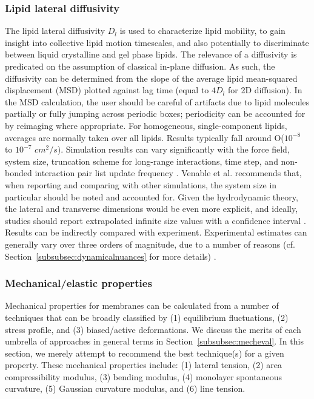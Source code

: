 \documentclass[9pt,bestpractices]{livecoms}
\begin{document}
\subsubsection{Lipid lateral diffusivity}
\label{subsubsec:latdiff}
The lipid lateral diffusivity $D_l$ is used to characterize lipid mobility, to gain insight into collective lipid motion timescales, and also potentially to discriminate between liquid crystalline and gel phase lipids.
The relevance of a diffusivity is predicated on the assumption of classical in-plane diffusion.
As such, the diffusivity can be determined from the slope of the average lipid mean-squared displacement (MSD) plotted against lag time (equal to $4D_l$ for 2D diffusion).
In the MSD calculation, the user should be careful of artifacts due to lipid molecules partially or fully jumping across periodic boxes; periodicity can be accounted for by reimaging where appropriate.
For homogeneous, single-component lipids, averages are normally taken over all lipids.
Results typically fall around O($10^{-8}$ to $10^{-7}$ $cm^2/s$).
Simulation results can vary significantly with the force field, system size, truncation scheme for long-range interactions, time step, and non-bonded interaction pair list update frequency \cite{Poger2016}.
Venable et al. recommends that, when reporting and comparing with other simulations, the system size in particular should be noted and accounted for.
Given the hydrodynamic theory, the lateral and transverse dimensions would be even more explicit, and ideally, studies should report extrapolated infinite size values with a confidence interval \cite{Venable2017}.
Results can be indirectly compared with experiment.
Experimental estimates can generally vary over three orders of magnitude, due to a number of reasons (cf. Section~\ref{subsubsec:dynamicalnuances} for more details) \cite{Poger2016}.

\subsubsection{Mechanical/elastic properties}
\label{subsubsec:mechprops}
Mechanical properties for membranes can be calculated from a number of techniques that can be broadly classified by (1) equilibrium fluctuations, (2) stress profile, and (3) biased/active deformations.
We discuss the merits of each umbrella of approaches in general terms in Section~\ref{subsubsec:mecheval}.
In this section, we merely attempt to recommend the best technique(s) for a given property.
These mechanical properties include: (1) lateral tension, (2) area compressibility modulus, (3) bending modulus, (4) monolayer spontaneous curvature, (5) Gaussian curvature modulus, and (6) line tension.
\end{document}
